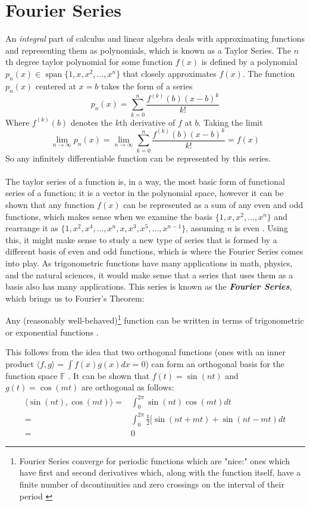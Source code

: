 \documentclass[12pt]{article}
\DeclareMathOperator{\spn}{span}
\begin{document}
    \section{Fourier Series}
    An \emph{integral} part of calculus and linear algebra deals with approximating functions and representing them as polynomials, which is known as a Taylor Series. The $n$th degree taylor polynomial for some function $f(x)$ is defined by a polynomial  $p_n(x) \in \spn\{1, x, x^2,\ldots,x^n\}$ that closely approximates $f(x)$. The function $p_n(x)$ centered at $x=b$ takes the form of a series  \[ p_n(x)=\sum_{k=0}^n \frac{f^{(k)}(b)(x-b)^k}{k!}\] Where $f^{(k)}(b)$ denotes the  $k$th derivative of  $f$ at  $b$. Taking the limit  \[\lim_{n \to \infty} p_n(x) = \lim_{n \to \infty} \sum_{k=0}^n \frac{f^{(k)}(b)(x-b)^k}{k!} = f(x)\] So any infinitely differentiable function can be represented by this series.\\\\
    The taylor series of a function is, in a way, the most basic form of functional series of a function; it is a vector in the polynomial space, however it can be shown that any function $f(x)$ can be represented as a sum of any even and odd functions, which makes sense when we examine the basis $\{1, x, x^2,\ldots,x^n\}$ and rearrange it as $\{1,x^2,x^4,\ldots,x^n,x,x^3,x^5,\ldots,x^{n-1}\}$, assuming $n$ is even \cite{directsums}. Using this, it might make sense to study a new type of series that is formed by a different basis of even and odd functions, which is where the Fourier Series comes into play. As trigonometric functions have many applications in math, physics, and the natural sciences, it would make sense that a series that uses them as a basis also has many applications. This series is known as the \textbf{\emph{Fourier Series}}, which brings us to Fourier's Theorem: 
    \begin{theorem}
        Any (reasonably well-behaved)\footnote{Fourier Series converge for periodic functions which are "nice:" ones which have first and second derivatives which, along with the function itself, have a finite number of dscontinuities and zero crossings on the interval of their period \cite{reed}} function can be written in terms of trigonometric or exponential functions \cite{harvard}.
    \end{theorem}
    This follows from the idea that two orthogonal functions (ones with an inner product $\langle f, g \rangle = \int f(x)g(x)dx = 0$) can form an orthogonal basis for the function space $\mathbb{F}$ \cite{linalg}. It can be shown that  $f(t) = \sin(nt)$ and $g(t) = \cos(mt)$ are orthogonal as follows:
    \begin{align}
        \langle \sin(nt), \cos(mt) \rangle = & \int_{0}^{2\pi}\sin(nt)\cos(mt)dt \\
                           = & \int_{0}^{2\pi} \frac{1}{2}[\sin(nt+mt)+\sin(nt-mt)dt \\
                           = & 0
    \end{align}
\end{document}
